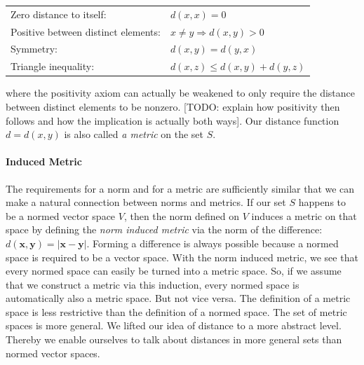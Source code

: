 \medskip
\begin{tabular}{l l}
Zero distance to itself:            & $d(x, x) = 0$  \\
Positive between distinct elements: & $x \neq y \Rightarrow d(x,y) > 0$  \\
Symmetry:                           & $d(x, y) = d(y, x)$  \\
Triangle inequality:                & $d(x,z) \leq d(x,y) + d(y,z)$
\end{tabular}
\medskip

where the positivity axiom can actually be weakened to only require the distance between distinct elements to be nonzero. [TODO: explain how positivity then follows and how the implication is actually both ways]. Our distance function $d = d(x,y)$ is also called \emph{a metric} on the set $S$. 








\paragraph{Induced Metric}
The requirements for a norm and for a metric are sufficiently similar that we can make a natural connection between norms and metrics. If our set $S$ happens to be a normed vector space $V$, then the norm defined on $V$ induces a metric on that space by defining the \emph{norm induced metric} via the norm of the difference: $d(\mathbf{x, y}) = |\mathbf{x-y}|$. Forming a difference is always possible because a normed space is required to be a vector space. With the norm induced metric, we see that every normed space can easily be turned into a metric space. So, if we assume that we construct a metric via this induction, every normed space is automatically also a metric space. But not vice versa. The definition of a metric space is less restrictive than the definition of a normed space. The set of metric spaces is more general. We lifted our idea of distance to a more abstract level. Thereby we enable ourselves to talk about distances in more general sets than normed vector spaces.

